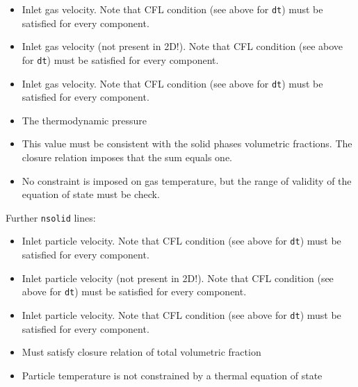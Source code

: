 \begin{itemize}
\item
{}
{Inlet gas velocity. Note that CFL condition (see above for {\tt dt}) 
must be satisfied for every component.}

\item
{}
{Inlet gas velocity (not present in 2D!).
Note that CFL condition (see above for {\tt dt}) 
must be satisfied for every component.}

\item
{}
{Inlet gas velocity. Note that CFL condition (see above for {\tt dt}) 
must be satisfied for every component.}

\item
{}
{The thermodynamic pressure}

\item
{}
{This value must be consistent with the solid phases volumetric fractions.
The closure relation imposes that the sum equals one.}

\item
{}
{No constraint is imposed on gas temperature, but the range of validity
of the equation of state must be check.}
\end{itemize}

Further {\tt nsolid} lines:
\begin{itemize}
\item
{}
{Inlet particle velocity.
Note that CFL condition (see above for {\tt dt}) 
must be satisfied for every component.}

\item
{}
{Inlet particle velocity (not present in 2D!).
Note that CFL condition (see above for {\tt dt}) 
must be satisfied for every component.}

\item
{}
{Inlet particle velocity.
Note that CFL condition (see above for {\tt dt}) 
must be satisfied for every component.}

\item
{}
{Must satisfy closure relation of total volumetric fraction}

\item
{}
{Particle temperature is not constrained by a thermal equation of state}

\end{itemize}

